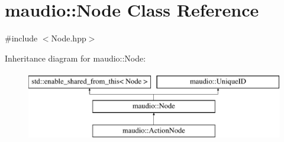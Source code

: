 \hypertarget{classmaudio_1_1Node}{\section{maudio\-:\-:Node Class Reference}
\label{classmaudio_1_1Node}
}


{\ttfamily \#include $<$Node.\-hpp$>$}

Inheritance diagram for maudio\-:\-:Node\-:\begin{figure}[H]
\begin{center}
\leavevmode
\includegraphics[height=3.000000cm]{classmaudio_1_1Node}
\end{center}
\end{figure}

